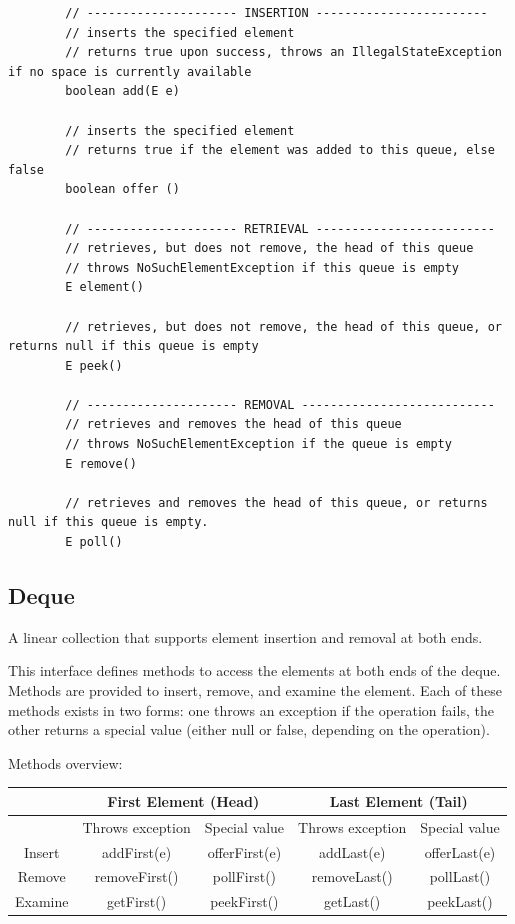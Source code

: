\documentclass{scrartcl}
\begin{document}
    \bigskip

    \begin{lstlisting}
        // --------------------- INSERTION ------------------------
        // inserts the specified element
        // returns true upon success, throws an IllegalStateException if no space is currently available
        boolean add(E e)

        // inserts the specified element
        // returns true if the element was added to this queue, else false
        boolean offer ()

        // --------------------- RETRIEVAL -------------------------
        // retrieves, but does not remove, the head of this queue
        // throws NoSuchElementException if this queue is empty
        E element()

        // retrieves, but does not remove, the head of this queue, or returns null if this queue is empty
        E peek()

        // --------------------- REMOVAL ---------------------------
        // retrieves and removes the head of this queue
        // throws NoSuchElementException if the queue is empty
        E remove()

        // retrieves and removes the head of this queue, or returns null if this queue is empty.
        E poll()
    \end{lstlisting}

\subsection{Deque}

    A linear collection that supports element insertion and removal at both ends.

    This interface defines methods to access the elements at both ends of the deque. Methods are provided to insert, remove, and examine the element. Each of these methods exists in two forms: one throws an exception if the operation fails, the other returns a special value (either null or false, depending on the operation).

    \bigskip

    Methods overview:

    \bigskip

    \begin{tabular}{|c|c|c|c|c|}
        \hline
        &  \multicolumn{2}{c}{First Element (Head)} & \multicolumn{2}{c}{Last Element (Tail)} \\
        \hline
        & Throws exception & Special value  & Throws exception & Special value  \\
        \hline
        Insert & addFirst(e) & offerFirst(e) & addLast(e) & offerLast(e) \\
        \hline
        Remove& removeFirst() & pollFirst() & removeLast() & pollLast() \\
        \hline
        Examine& getFirst() & peekFirst() & getLast() &  peekLast()\\
        \hline
    \end{tabular}
\end{document}
